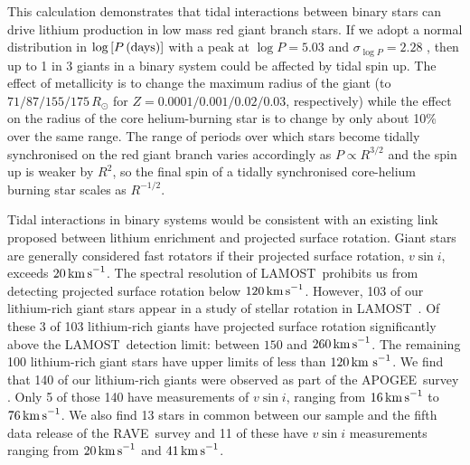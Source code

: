 \documentclass[twocolumn]{aastex62}
\newcommand\lamost{LAMOST}
\newcommand\apogee{APOGEE}
\newcommand\rave{RAVE}
\begin{document}
This calculation demonstrates that tidal interactions between binary stars can drive 
lithium production in low mass red giant branch stars.
If we adopt a normal distribution in $\log{[P\,{\rm (days)}]}$ with a peak at $\log{P} = 5.03$ and $\sigma_{\log{P}} = 2.28$ \citep[as inferred from observations;][]{Raghavan_2010}, then up to 1 in 3 giants in a binary system could be affected by tidal spin up.
The effect of metallicity
is to change the maximum radius of the giant (to $71/87/155/175\,R_\odot$ for $Z = 0.0001/0.001/0.02/0.03$, respectively) 
while the effect on the 
radius of the core helium-burning star is to change by only about 10\% over the same
range. The range of periods over which stars become tidally synchronised on the red giant
branch varies accordingly as $P \propto R^{3/2}$ and the spin up is weaker by $R^2$, so the
final spin of a tidally synchronised core-helium burning star scales as $R^{-1/2}$.





Tidal interactions in binary systems would be consistent with an existing link proposed
between lithium enrichment and projected surface rotation. Giant 
stars are generally considered fast rotators if their projected surface rotation, 
$v\sin{i}$, exceeds $20\,{\rm km\,s}^{-1}$. The spectral resolution of \lamost\
prohibits us from detecting projected surface rotation below $120\,{\rm km\,s}^{-1}$.  
However, 103 of our lithium-rich giant stars appear in a study of stellar
rotation in \lamost\ \citep{Frasca_2016}. Of these 3 of 103 lithium-rich giants have
projected surface rotation significantly above the \lamost\ detection limit: between
$150$ and $260\,{\rm km\,s}^{-1}$. 
The remaining 100 lithium-rich giant stars have upper limits of less than $120\,{\rm km~s}^{-1}$.
We find that 140
of our lithium-rich giants were observed as part of the \apogee\ survey \citep{Abolfathi_2018}.
Only 5 of those 140 have measurements of $v\sin{i}$, ranging from $16\,{\rm km\,s}^{-1}$ to
$76\,{\rm km\,s}^{-1}$.  We also find 13 stars in common between our sample and
the fifth data release of the \rave\ survey \citep{Kunder_2017} and 11 of these 
have $v\sin{i}$ measurements ranging from $20\,{\rm km\,s}^{-1}$ and $41\,{\rm km\,s}^{-1}$. 
\end{document}
